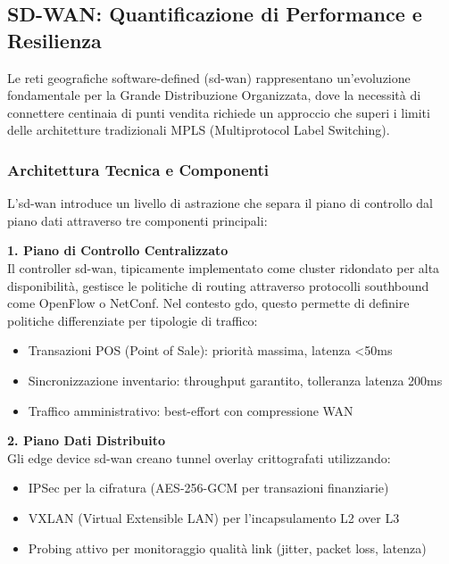 \subsection{\texorpdfstring{\textbf{SD-WAN: Quantificazione di Performance e Resilienza}}{3.3.1 - SD-WAN: Quantificazione di Performance e Resilienza}}

Le reti geografiche software-defined (\gls{sd-wan}) rappresentano un'evoluzione fondamentale per la Grande Distribuzione Organizzata, dove la necessità di connettere centinaia di punti vendita richiede un approccio che superi i limiti delle architetture tradizionali MPLS (Multiprotocol Label Switching).

\subsubsection{\texorpdfstring{\textbf{Architettura Tecnica e Componenti}}{3.3.1.1 - Architettura Tecnica e Componenti}}

L'\gls{sd-wan} introduce un livello di astrazione che separa il piano di controllo dal piano dati attraverso tre componenti principali:

\textbf{1. Piano di Controllo Centralizzato}\\
Il controller \gls{sd-wan}, tipicamente implementato come cluster ridondato per alta disponibilità, gestisce le politiche di routing attraverso protocolli southbound come OpenFlow o NetConf. Nel contesto \gls{gdo}, questo permette di definire politiche differenziate per tipologie di traffico:
\begin{itemize}
    \item Transazioni POS (Point of Sale): priorità massima, latenza <50ms
    \item Sincronizzazione inventario: throughput garantito, tolleranza latenza 200ms
    \item Traffico amministrativo: best-effort con compressione WAN
\end{itemize}

\textbf{2. Piano Dati Distribuito}\\
Gli edge device \gls{sd-wan} creano tunnel overlay crittografati utilizzando:
\begin{itemize}
    \item IPSec per la cifratura (AES-256-GCM per transazioni finanziarie)
    \item VXLAN (Virtual Extensible LAN) per l'incapsulamento L2 over L3
    \item Probing attivo per monitoraggio qualità link (jitter, packet loss, latenza)
\end{itemize}

